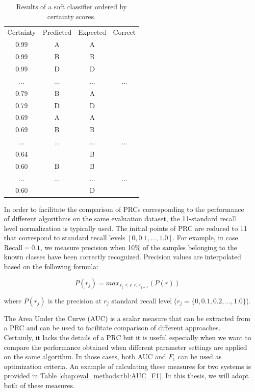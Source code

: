 \begin{table}[t]
	\center
	\caption{Results of a soft classifier ordered by certainty scores. }\label{chap:eval_methods:tbl:prc}
	\begin{tabular}{|c|c|c|c|}
		\cline{1-4}
		Certainty & Predicted & Expected & Correct\\
		\cline{1-4}
		0.99 & A & A & \cmark \\
		0.99 & B & B & \cmark \\
		0.99 & D & D & \cmark \\
		... & ... & ... & ... \\
		0.79 & B & A & \xmark \\
		0.79 & D & D & \cmark \\
		0.69 & A & A & \xmark \\
		0.69 & B & B & \cmark \\
		... & ... & ... & ... \\
		0.64 & \emptyset & B & \xmark \\
		0.60 & B & B & \cmark \\
		... & ... & ... & ... \\
		0.60 & \emptyset & D & \xmark \\
		\cline{1-4}
	\end{tabular}
\end{table}

In order to facilitate the comparison of PRCs corresponding to the performance of different algorithms on the same evaluation dataset, the 11-standard recall level normalization is typically used. The initial points of PRC are reduced to 11 that correspond to standard recall levels $[0,0.1,...,1.0]$. For example, in case Recall$=0.1$, we measure precision when 10\% of the samples belonging to the known classes have been correctly recognized. Precision values are interpolated based on the following formula:

\begin{equation}\label{chap:eval_methods:eq:11recall_level}
	P(r_j)=max_{r_j \leqslant r \leqslant r_{j+1}}(P(r))
\end{equation}

\noindent
where $P(r_j)$ is the precision at $r_j$ standard recall level ($r_j=\{0,0.1,0.2,...,1.0\}$).

The Area Under the Curve (AUC) is a scalar measure that can be extracted from a PRC and can be used to facilitate comparison of different approaches. Certainly, it lacks the details of a PRC but it is useful especially when we want to compare the performance obtained when different parameter settings are applied on the same algorithm. In those cases, both AUC and $F_1$ can be used as optimization criteria. An example of calculating these measures for two systems is provided in Table \ref{chap:eval_methods:tbl:AUC_F1}. In this thesis, we will adopt both of these measures.

